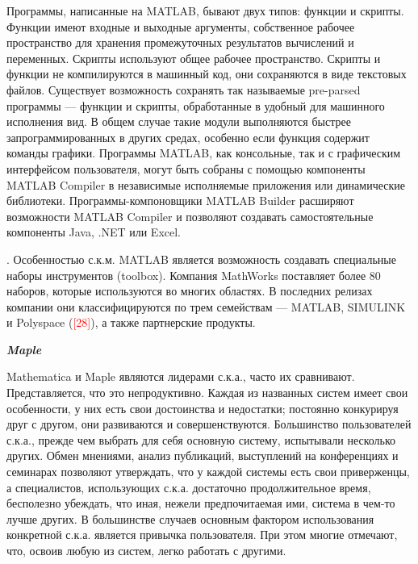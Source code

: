 Программы, написанные на MATLAB, бывают двух типов: функции и скрипты. Функции имеют входные и выходные аргументы, собственное рабочее пространство для хранения промежуточных результатов вычислений и переменных. Скрипты используют общее рабочее пространство. Скрипты и функции не компилируются в машинный код, они сохраняются в виде текстовых файлов. Существует возможность сохранять так называемые pre-parsed программы --- функции и скрипты, обработанные в удобный для машинного исполнения вид. В общем случае такие модули выполняются быстрее запрограммированных в других средах, особенно если функция содержит команды графики.
Программы MATLAB, как консольные, так и с графическим интерфейсом пользователя, могут быть собраны с помощью компоненты MATLAB Compiler в независимые исполняемые приложения или динамические библиотеки. Программы-компоновщики MATLAB Builder расширяют возможности MATLAB Compiler и позволяют создавать самостоятельные компоненты Java, .NET или Excel.

.
Особенностью с.к.м. MATLAB является возможность создавать специальные наборы инструментов (toolbox). Компания MathWorks поставляет более 80 наборов, которые используются во многих областях. В последних релизах компании они классифицируются по трем семействам --- MATLAB, SIMULINK и Polyspace (\textcolor{red}{[28]}), а также партнерские продукты.

\textbf{\textit{Maple}}

Mathematica и Maple являются лидерами с.к.а., часто их сравнивают. Представляется, что это непродуктивно. Каждая из названных систем имеет свои особенности, у них есть свои достоинства и недостатки; постоянно конкурируя друг с другом, они развиваются и совершенствуются. Большинство пользователей с.к.а., прежде чем выбрать для себя основную систему, испытывали несколько других. Обмен мнениями, анализ публикаций, выступлений на конференциях и семинарах позволяют утверждать, что у каждой системы есть свои приверженцы, а специалистов, использующих с.к.а. достаточно продолжительное время, бесполезно убеждать, что иная, нежели предпочитаемая ими, система в чем-то лучше других. В большинстве случаев основным фактором использования конкретной с.к.а. является привычка пользователя. При этом многие отмечают, что, освоив любую из систем, легко работать с другими.

